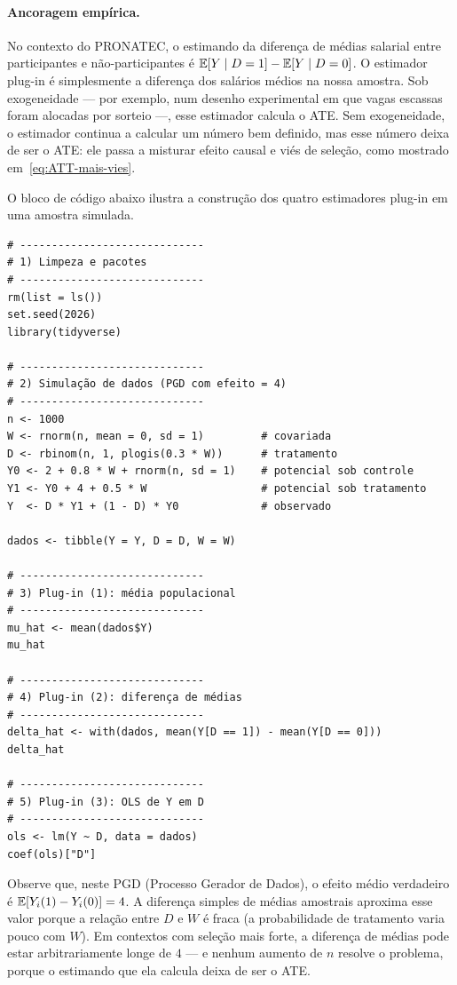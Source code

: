 \paragraph{Ancoragem empírica.} No contexto do PRONATEC, o estimando da diferença de médias salarial entre participantes e não-participantes é $\mathbb{E}[Y \mid D=1] - \mathbb{E}[Y \mid D=0]$. O estimador plug-in é simplesmente a diferença dos salários médios na nossa amostra. Sob exogeneidade --- por exemplo, num desenho experimental em que vagas escassas foram alocadas por sorteio ---, esse estimador calcula o ATE. Sem exogeneidade, o estimador continua a calcular um número bem definido, mas esse número deixa de ser o ATE: ele passa a misturar efeito causal e viés de seleção, como mostrado em~\eqref{eq:ATT-mais-vies}.

O bloco de código abaixo ilustra a construção dos quatro estimadores plug-in em uma amostra simulada.

\begin{lstlisting}[caption={Estimadores plug-in básicos.}, label={lst:plug-in}]
# -----------------------------
# 1) Limpeza e pacotes
# -----------------------------
rm(list = ls())
set.seed(2026)
library(tidyverse)

# -----------------------------
# 2) Simulação de dados (PGD com efeito = 4)
# -----------------------------
n <- 1000
W <- rnorm(n, mean = 0, sd = 1)         # covariada
D <- rbinom(n, 1, plogis(0.3 * W))      # tratamento
Y0 <- 2 + 0.8 * W + rnorm(n, sd = 1)    # potencial sob controle
Y1 <- Y0 + 4 + 0.5 * W                  # potencial sob tratamento
Y  <- D * Y1 + (1 - D) * Y0             # observado

dados <- tibble(Y = Y, D = D, W = W)

# -----------------------------
# 3) Plug-in (1): média populacional
# -----------------------------
mu_hat <- mean(dados$Y)
mu_hat

# -----------------------------
# 4) Plug-in (2): diferença de médias
# -----------------------------
delta_hat <- with(dados, mean(Y[D == 1]) - mean(Y[D == 0]))
delta_hat

# -----------------------------
# 5) Plug-in (3): OLS de Y em D
# -----------------------------
ols <- lm(Y ~ D, data = dados)
coef(ols)["D"]
\end{lstlisting}

Observe que, neste PGD (Processo Gerador de Dados), o efeito médio verdadeiro é $\mathbb{E}[Y_i(1) - Y_i(0)] = 4$. A diferença simples de médias amostrais aproxima esse valor porque a relação entre $D$ e $W$ é fraca (a probabilidade de tratamento varia pouco com $W$). Em contextos com seleção mais forte, a diferença de médias pode estar arbitrariamente longe de $4$ --- e nenhum aumento de $n$ resolve o problema, porque o estimando que ela calcula deixa de ser o ATE.

